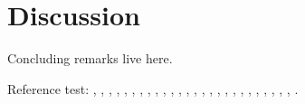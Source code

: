 \section{Discussion}
\label{sec:discussion}

Concluding remarks live here.

Reference test:
\cite{ArcherWest2003},
\cite{BarrettJolleyetal2010},
\cite{BuckwalterMankin1998},
\cite{CarneyMuir1988},
\cite{Chaetal2009},
\cite{Chuetal2006},
\cite{Clarketal2011},
\cite{Edwardsetal1994},
\cite{Fassbender1987},
\cite{Grishkoetal2010},
\cite{Halletal1996},
\cite{Hille2001},
\cite{HorriganAldrich2002},
\cite{LesageLazdunski2000},
\cite{Lewisetal2011},
\cite{Maleckaretal2009},
\cite{Mankin1982},
\cite{MillwardSadleretal2000},
\cite{Nygrenetal1998},
\cite{Poole1997},
\cite{RadhakrishnanHindmarsh1993},
\cite{Scholz2002},
\cite{Stockwell1991},
\cite{Sugimotoetal1996},
\cite{Tsugaetal2001},
\cite{UNKNOWN},
\cite{Wilkinsetal2000}.

